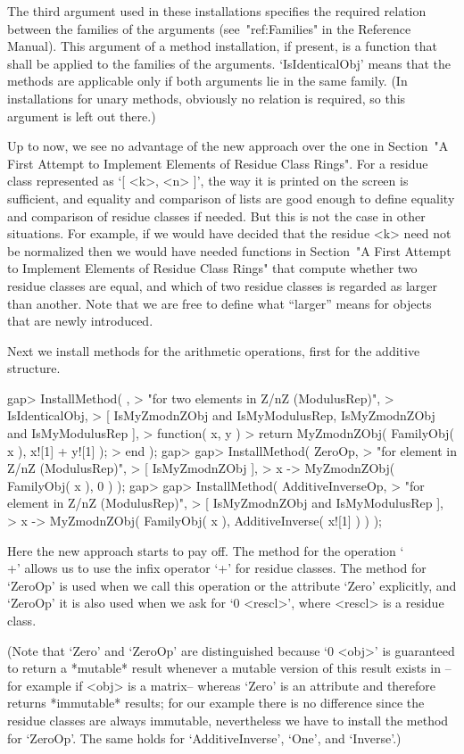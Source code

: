 The third argument used in these installations specifies the required
relation between the families of the arguments
(see~"ref:Families" in the Reference Manual).
This argument of a method installation, if present, is a function that shall
be applied to the families of the arguments.
`IsIdenticalObj' means that the methods are applicable only if both arguments
lie in the same family.
(In installations for unary methods, obviously no relation is required,
so this argument is left out there.)

Up to now, we see no advantage of the new approach over the one in
Section~"A First Attempt to Implement Elements of Residue Class Rings".
For a residue class represented as `[ <k>, <n> ]', the way it is printed
on the screen is sufficient, and equality and comparison of lists are
good enough to define equality and comparison of residue classes if needed.
But this is not the case in other situations.
For example, if we would have decided that the residue <k> need not be
normalized then we would have needed functions in
Section~"A First Attempt to Implement Elements of Residue Class Rings"
that compute whether two residue classes are equal, and which of two
residue classes is regarded as larger than another.
Note that we are free to define what ``larger'' means for objects that
are newly introduced.

Next we install methods for the arithmetic operations,
first for the additive structure.

\beginexample
gap> InstallMethod( \+,
>    "for two elements in Z/nZ (ModulusRep)",
>    IsIdenticalObj,
>    [ IsMyZmodnZObj and IsMyModulusRep, IsMyZmodnZObj and IsMyModulusRep ],
>    function( x, y )
>    return MyZmodnZObj( FamilyObj( x ), x![1] + y![1] );
>    end );
gap> 
gap> InstallMethod( ZeroOp,
>    "for element in Z/nZ (ModulusRep)",
>    [ IsMyZmodnZObj ],
>    x -> MyZmodnZObj( FamilyObj( x ), 0 ) );
gap> 
gap> InstallMethod( AdditiveInverseOp,
>    "for element in Z/nZ (ModulusRep)",
>    [ IsMyZmodnZObj and IsMyModulusRep ],
>    x -> MyZmodnZObj( FamilyObj( x ), AdditiveInverse( x![1] ) ) );
\endexample

Here the new approach starts to pay off.
The method for the operation `\\+' allows us to use the infix
operator `+' for residue classes.
The method for `ZeroOp' is used when we call this operation or the
attribute `Zero' explicitly,
and `ZeroOp' it is also used when we ask for `0 \* <rescl>',
where <rescl> is a residue class.

(Note that `Zero' and `ZeroOp' are distinguished
because `0 \* <obj>' is guaranteed to return a *mutable* result whenever
a mutable version of this result exists in {\GAP} --for example if <obj>
is a matrix-- whereas `Zero' is an attribute and therefore returns
*immutable* results;
for our example there is no difference since the residue classes are
always immutable,
nevertheless we have to install the method for `ZeroOp'.
The same holds for `AdditiveInverse', `One', and `Inverse'.)

